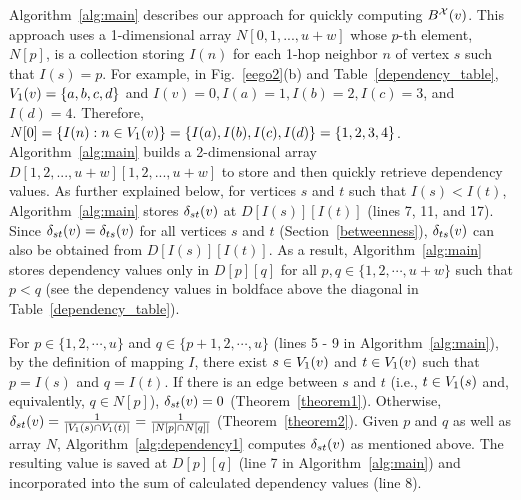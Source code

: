 Algorithm~\ref{alg:main} describes our approach for quickly computing $\BX{v}$.
This approach uses a 1-dimensional array $N[0,1,...,u+w]$ whose $p$-th element, $N[p]$, is a collection storing $I(n)$ for each 1-hop neighbor $n$ of vertex $s$ such that $I(s)=p$.
For example, in Fig.~\ref{eego2}(b) and Table~\ref{dependency_table}, $\V{v}{1}=\{a, b, c, d\}$ and $I(v) = 0, I(a) = 1, I(b) = 2, I(c) = 3$, and $I(d) = 4$.
Therefore, $N[0] = \{I(n) : n \in \V{v}{1} \} = \{I(a), I(b), I(c), I(d) \} = \{ 1, 2, 3, 4 \}$.
Algorithm~\ref{alg:main} builds a 2-dimensional array $D[1,2,...,u+w][1,2,...,u+w]$ to store and then quickly retrieve dependency values. 
As further explained below, for vertices $s$ and $t$ such that $I(s) < I(t)$, Algorithm~\ref{alg:main} stores $\D{s}{t}{v}$ at $D[I(s)][I(t)]$ (lines 7, 11, and 17).
Since $\D{s}{t}{v} = \D{t}{s}{v}$ for all vertices $s$ and $t$ (Section~\ref{betweenness}), $\D{t}{s}{v}$ can also be obtained from $D[I(s)][I(t)]$.
As a result, Algorithm~\ref{alg:main} stores dependency values only in $D[p][q]$ for all $p, q \in \{1, 2, \cdots, u+w \}$ such that $p < q$ (see the dependency values in boldface above the diagonal in Table~\ref{dependency_table}).


For $p \in \{1, 2, \cdots, u \}$ and $q \in \{ p+1, 2, \cdots, u \}$ (lines 5 - 9 in Algorithm~\ref{alg:main}), by the definition of mapping $I$, there exist $s \in \V{v}{1}$ and $t \in \V{v}{1}$ such that $p = I(s)$ and $q = I(t)$.
If there is an edge between $s$ and $t$ (i.e., $t \in \V{s}{1}$ and, equivalently, $q \in N[p]$), $\D{s}{t}{v} = 0$ (Theorem~\ref{theorem1}).
Otherwise, $\D{s}{t}{v} = \frac{1}{|\V{s}{1} \cap \V{t}{1}|} = \frac{1}{|N[p] \cap N[q]|}$ (Theorem~\ref{theorem2}).
Given $p$ and $q$ as well as array $N$, Algorithm~\ref{alg:dependency1} computes $\D{s}{t}{v}$ as mentioned above. 
The resulting value is saved at $D[p][q]$ (line 7 in Algorithm~\ref{alg:main}) and incorporated into the sum of calculated dependency values (line 8).


%

